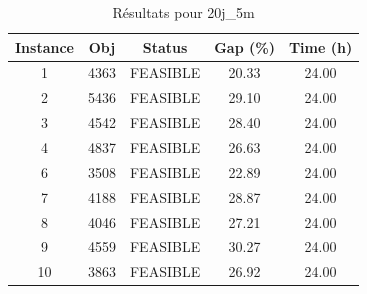 
\begin{table}[h]
\centering
\begin{tabular}{|c|c|c|c|c|}
\hline
Instance & Obj & Status & Gap (\%) & Time (h) \\
\hline
1 & 4363 & FEASIBLE & 20.33 & 24.00 \\
2 & 5436 & FEASIBLE & 29.10 & 24.00 \\
3 & 4542 & FEASIBLE & 28.40 & 24.00 \\
4 & 4837 & FEASIBLE & 26.63 & 24.00 \\
6 & 3508 & FEASIBLE & 22.89 & 24.00 \\
7 & 4188 & FEASIBLE & 28.87 & 24.00 \\
8 & 4046 & FEASIBLE & 27.21 & 24.00 \\
9 & 4559 & FEASIBLE & 30.27 & 24.00 \\
10 & 3863 & FEASIBLE & 26.92 & 24.00 \\
\hline
\end{tabular}
\caption{Résultats pour 20j_5m}
\end{table}
